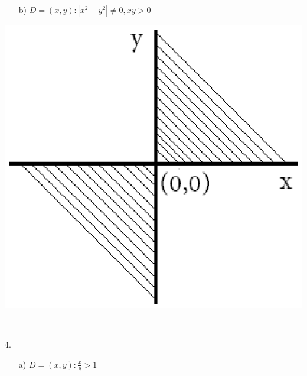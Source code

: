 \documentclass[11pt]{amsbook}
\begin{document}
	
	
	\centerline{\thepage}
	\bigskip
	
	\begin{enumerate}
	\noindent
	\begin{minipage}{0.6\textwidth}\raggedright
		\item[]
		\begin{enumerate}
			\item[b)]\quad $D = {(x, y): |x^2 - y^2| \neq 0, xy>0}$
		\end{enumerate}
	\end{minipage}
	\hfill%
	\begin{minipage}{0.3\textwidth}
		\includegraphics[width=0.8\linewidth]{images/b2p2-278-2b.eps}
	\end{minipage}%
	\\
	\begin{minipage}{0.6\textwidth}\raggedright
		\item[4.]
		\begin{enumerate}
		\item[a)]\quad $D = {(x, y): \frac{x}{y} > 1}$
		\end{enumerate}
	\end{minipage}
	\hfill%
	\begin{minipage}{0.3\textwidth}

\end{minipage}
\end{enumerate}
\end{document}
